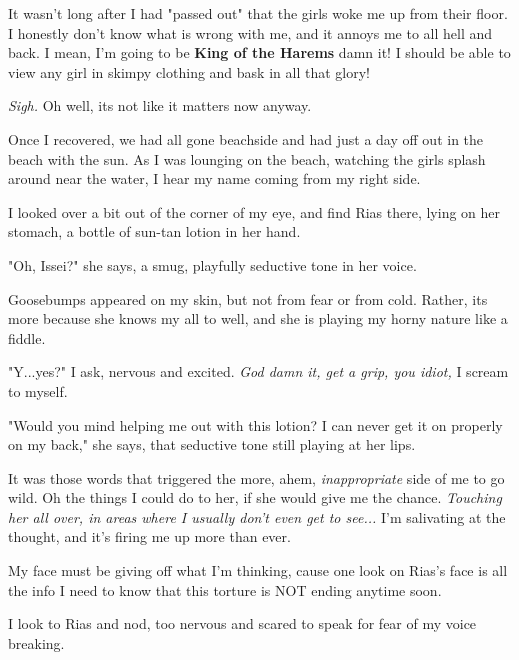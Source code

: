 \documentclass{article}
\begin{document}
It wasn't long after I had "passed out" that the girls woke me up from their floor. I honestly don't know what is wrong with me, and it annoys me to all hell and back. I mean, I'm going to be \textbf{King of the Harems} damn it! I should be able to view any girl in skimpy clothing and bask in all that glory!

\emph{Sigh.} Oh well, its not like it matters now anyway.

Once I recovered, we had all gone beachside and had just a day off out in the beach with the sun. As I was lounging on the beach, watching the girls splash around near the water, I hear my name coming from my right side.

I looked over a bit out of the corner of my eye, and find Rias there, lying on her stomach, a bottle of sun-tan lotion in her hand.

"Oh, Issei?" she says, a smug, playfully seductive tone in her voice.

Goosebumps appeared on my skin, but not from fear or from cold. Rather, its more because she knows my all to well, and she is playing my horny nature like a fiddle.
 
"Y...yes?" I ask, nervous and excited. \emph{God damn it, get a grip, you idiot,} I scream to myself.

"Would you mind helping me out with this lotion? I can never get it on properly on my back," she says, that seductive tone still playing at her lips.

It was those words that triggered the more, ahem, \emph{inappropriate} side of me to go wild. Oh the things I could do to her, if she would give me the chance. \emph{Touching her all over, in areas where I usually don't even get to see...} I'm salivating at the thought, and it's firing me up more than ever.

My face must be giving off what I'm thinking, cause one look on Rias's face is all the info I need to know that this torture is NOT ending anytime soon.

I look to Rias and nod, too nervous and scared to speak for fear of my voice breaking. 
\end{document}
